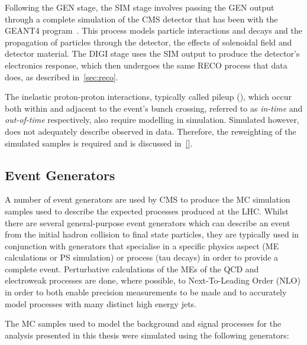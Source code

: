 Following the GEN stage, the SIM stage involves passing the GEN output through a complete simulation of the CMS detector that has been with the GEANT4 program~\cite{geant4,Lefebure:1999wja}.
This process models particle interactions and decays and the propagation of particles through the detector, the effects of solenoidal field and detector material.
The DIGI stage uses the SIM output to produce the detector's electronics response, which then undergoes the same RECO process that data does, as described in~\ref{sec:reco}.

The inelastic proton-proton interactions, typically called pileup (\PU), which occur both within and adjacent to the event's bunch crossing, referred to as \emph{in-time} and \emph{out-of-time} \PU  respectively, also require modelling in simulation.
Simulated \PU however, does not adequately describe observed \PU in data.
Therefore, the reweighting of the simulated samples is required and is discussed in~\ref{}.

\subsection{Event Generators}\label{subsec:eventGenerators}
A number of event generators are used by CMS to produce the MC simulation samples used to describe the expected processes produced at the LHC.
Whilst there are several general-purpose event generators which can describe an event from the initial hadron collision to final state particles, they are typically used in conjunction with generators that specialise in a specific physics aspect (\ie ME calculations or PS simulation) or process (\eg tau decays) in order to provide a complete event.
Perturbative calculations of the MEs of the QCD and electroweak processes are done, where possible, to Next-To-Leading Order (NLO) in order to both enable precision measurements to be made and to accurately model processes with many distinct high energy jets.

The MC samples used to model the background and signal processes for the analysis presented in this thesis were simulated using the following generators:

